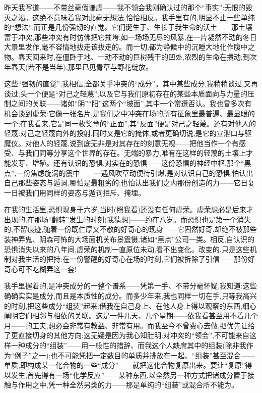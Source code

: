昨天我写道——不带丝毫假谦虚——我不领会我刚确认过的那个“事实”:无恨的毁灭之渴。这绝不意味着我对此毫无想法,恰恰相反。我手里有的,明显不止一些单纯的“想法”,而正是几份强韧的直觉。它们诞生于、生长于我生命的沃土——那土壤富于冲突,那些冲突有时仿佛把它摧垮,如一场场无尽的风暴,在一片凝然不动的冬日大景里发作,毫不容情地拔走该拔走的\dmark{}。而一切,都为静候中的沉睡大地化作腹中之物。春天回来时,在僵卧于地、一动不动的巨树残干的凹处,浓烈的生命在攒动;到次年春天(若不是当年),那里已见青草与野花绽放。

这些“强韧的直觉”,我相信,全都关乎冲突的“成分”。其中某些成分,我稍稍谈过,又再谈过;头一个便是“对己之轻蔑”,以及它与我们原初存在的某些本质面向与力量的压制之间的关联——诸如“阴”“阳”这两个“坡面”,其中一个常遭否认。我也曾多次有机会谈到虚荣:它像一张名片,是我们之中冲突在场的所有征象里最普遍、最显眼的一个;在我看来,它是同一枚奖章的“正面”,其“反面”便是对己之轻蔑。还有对他人的轻蔑:对己之轻蔑向外的投射,同时又是它的掩体,或者更确切说,是它的宣泄口与驱魔仪。对他人的轻蔑,说到底无非是对其存在的刻意无视——把他当作一个有感受、与我们同等分享这个世界的存在。无端的暴力,唯有在这样的轻蔑的土壤上才能发芽、增殖。还有认识的恐惧,对实在的恐惧——这份恐惧的神经中枢,那个“黑点”,一份焦虑旋涡的震中——一遇风吹草动便待引爆,是对认识自己的恐惧:怕认出自己那些姿态与遁词,哪怕是最粗劣的;也怕认出我们之内那份创造的力——它日复一日被我们用同样的姿态与遁词拒斥、掩埋。

在我的生活里,恐惧现身于六岁,当时(照我看)还没有任何虚荣。虚荣想必是后来才出现的,在那场“翻转”发生的时刻(我猜想)——约在八岁\dmark{}。而恐惧也是第一个消失的,不留痕迹,随着一份既仁厚又不敬的好奇心的现身——它固然好奇,却绝不被那些装神弄鬼、阴森可怖的大场面机关布景震慑,诸如“黑点”公司一类。相反,自认识的恐惧消失以来的八年间,虚荣的机制一直原位未动,看不出变化。改变的,只是这些机制对我生活的把持:在一份警醒的好奇心在场的时刻,它们被拆除了引信——那份好奇心可不吃糊弄这一套!

我手里握着的,是冲突成分的一整个谱系——凭第一手、不带分毫怀疑,我知道:这些确确实实是成分,而且是本质性的成分。而多少年来,我也同样一切在手,只等我高兴的时刻,把这些成分“组装”起来:借我在自己身上、在他人身上得以观察的东西,细心阐明它们相邻与相依的关联。这是一件几天、几个星期——依我看甚至用不着几个月——的工夫,想必会非常有教益、非常有用。而我至今不曾费心去做,把优先让给了更直接切身的其他方向;这无疑是因为我心知肚明:对冲突的“领会”,不可能来自这样一种成分的“组装”——用一般性的措辞、而我这个人缺席其中的组装(除非我作为“例子”之一);也不可能凭把一定数目的单质并排放在一起、“组装”甚至混合——单质,即构成某一化合物的一些“成分”——就把这化合物复原出来。要让“复原”得以发生,首先得有一场“化学反应”——某种东西,以全然另一种方式把诸成分置于接触与作用之中,凭一种全然另类的力——那是单纯的“组装”或混合所不能为。

